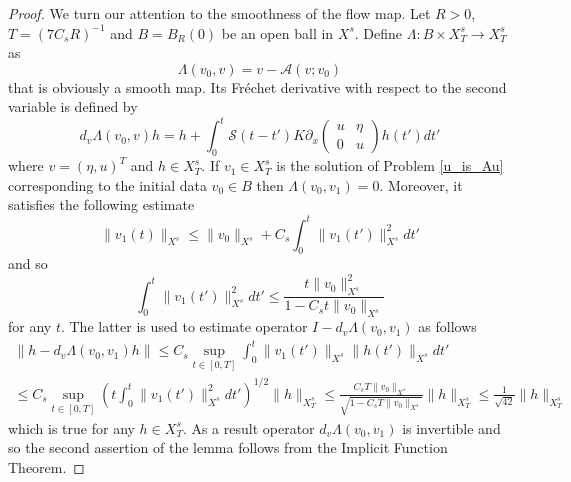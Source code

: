 \documentclass[reqno,12pt,a4paper]{article}
\theoremstyle{plain}
\begin{document}
\begin{proof}
We turn our attention to the smoothness of the flow map.
Let $R > 0$, $T = ( 7C_s R )^{-1}$ and
$B = B_R(0)$ be an open ball in $X^s$.
Define $\Lambda : B \times X^s_T \to X^s_T$ as
\[
	\Lambda(v_0, v) = v - \mathcal A(v; v_0)
\]
that is obviously a smooth map.
Its Fr\'echet derivative with respect to the second variable
is defined by
%
\[
	d_v\Lambda(v_0, v)h =
	h + \int_0^t \mathcal S(t - t') K \partial_x
	\begin{pmatrix}
		u & \eta
		\\
		0 & u
	\end{pmatrix}
	h(t')dt'
\]
%
where $v = (\eta, u)^T$ and $h \in X^s_T$.
If $v_1 \in X^s_T$ is the solution of Problem \eqref{u_is_Au}
corresponding to the initial data $v_0 \in B$ then
$\Lambda(v_0, v_1) = 0$.
Moreover, it satisfies the following estimate
%
\[
	\lVert v_1(t) \rVert_{X^s}
	\leqslant
	\lVert v_0 \rVert_{X^s} +
	C_s \int_0^t \lVert v_1(t') \rVert_{X^s}^2 dt'
\]
%
and so
%
\[
	\int_0^t \lVert v_1(t') \rVert_{X^s}^2 dt'
	\leqslant
	\frac{ t \lVert v_0 \rVert_{X^s}^2 }
	{1 - C_st \lVert v_0 \rVert_{X^s}}
\]
%
for any $t$.
The latter is used to estimate operator
$ I - d_v\Lambda(v_0, v_1) $ as follows
%
\begin{multline*}
	\lVert h - d_v\Lambda(v_0, v_1)h \rVert
	\leqslant
	C_s \sup _{t \in [0, T]} \int_0^t
	\lVert v_1(t') \rVert_{X^s}
	\lVert h(t') \rVert_{X^s} dt'
	\\
	\leqslant
	C_s \sup _{t \in [0, T]}
	\left(
		t \int_0^t \lVert v_1(t') \rVert _{X^s}^2 dt'
	\right) ^{1/2}
	\lVert h \rVert_{X^s_T} 
	\leqslant
	\frac{ C_sT \lVert v_0 \rVert_{X^s} }
	{ \sqrt{ 1 - C_sT \lVert v_0 \rVert_{X^s} } }
	\lVert h \rVert_{X^s_T} 
	\leqslant
	\frac 1
	{ \sqrt{ 42 } }
	\lVert h \rVert_{X^s_T} 
\end{multline*}
%
which is true for any $h \in X^s_T$.
As a result operator $d_v\Lambda(v_0, v_1)$ is invertible
and so the second assertion of the lemma follows from
the Implicit Function Theorem.
%
\end{proof}
\end{document}
